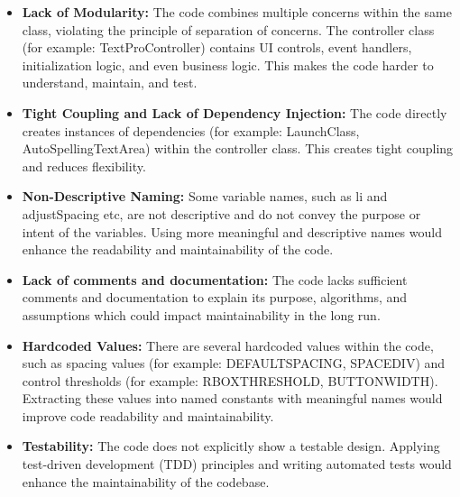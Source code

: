 \documentclass[12pt,letterpaper]{report}
\begin{document}
\begin{itemize}
    \item \textbf{Lack of Modularity:} The code combines multiple concerns within the same class, violating the principle of separation of concerns. The controller class (for example: TextProController) contains UI controls, event handlers, initialization logic, and even business logic. This makes the code harder to understand, maintain, and test.
    \item \textbf{Tight Coupling and Lack of Dependency Injection: }The code directly creates instances of dependencies (for example: LaunchClass, AutoSpellingTextArea) within the controller class. This creates tight coupling and reduces flexibility. 
    \item \textbf{Non-Descriptive Naming:} Some variable names, such as li and adjustSpacing etc, are not descriptive and do not convey the purpose or intent of the variables. Using more meaningful and descriptive names would enhance the readability and maintainability of the code.
    \item \textbf{Lack of comments and documentation:} The code lacks sufficient comments and documentation to explain its purpose, algorithms, and assumptions which could impact maintainability in the long run.
    \item \textbf{Hardcoded Values:} There are several hardcoded values within the code, such as spacing values (for example: DEFAULTSPACING, SPACEDIV) and control thresholds (for example: RBOXTHRESHOLD, BUTTONWIDTH). Extracting these values into named constants with meaningful names would improve code readability and maintainability.
    \item \textbf{Testability:} The code does not explicitly show a testable design. Applying test-driven development (TDD) principles and writing automated tests would enhance the maintainability of the codebase.
\end{itemize}



\end{document}
